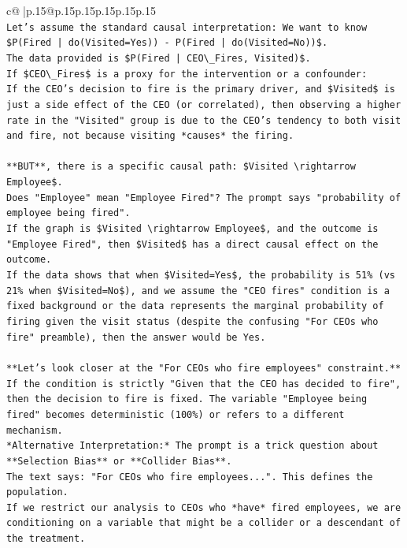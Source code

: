 \documentclass{article}
\begin{document}
{\begin{supertabular}{c@{$\;$}|p{.15\linewidth}@{}p{.15\linewidth}p{.15\linewidth}p{.15\linewidth}p{.15\linewidth}p{.15\linewidth}}
{{{\\ 
\texttt{Let's assume the standard causal interpretation: We want to know \$P(Fired | do(Visited=Yes)) {-} P(Fired | do(Visited=No))\$.} \\
\texttt{The data provided is \$P(Fired | CEO\textbackslash{}\_Fires, Visited)\$.} \\
\texttt{If \$CEO\textbackslash{}\_Fires\$ is a proxy for the intervention or a confounder:} \\
\texttt{If the CEO's decision to fire is the primary driver, and \$Visited\$ is just a side effect of the CEO (or correlated), then observing a higher rate in the "Visited" group is due to the CEO's tendency to both visit and fire, not because visiting *causes* the firing.} \\
\\ 
\texttt{**BUT**, there is a specific causal path: \$Visited \textbackslash{}rightarrow Employee\$.} \\
\texttt{Does "Employee" mean "Employee Fired"? The prompt says "probability of employee being fired".} \\
\texttt{If the graph is \$Visited \textbackslash{}rightarrow Employee\$, and the outcome is "Employee Fired", then \$Visited\$ has a direct causal effect on the outcome.} \\
\texttt{If the data shows that when \$Visited=Yes\$, the probability is 51\% (vs 21\% when \$Visited=No\$), and we assume the "CEO fires" condition is a fixed background or the data represents the marginal probability of firing given the visit status (despite the confusing "For CEOs who fire" preamble), then the answer would be Yes.} \\
\\ 
\texttt{**Let's look closer at the "For CEOs who fire employees" constraint.**} \\
\texttt{If the condition is strictly "Given that the CEO has decided to fire", then the decision to fire is fixed. The variable "Employee being fired" becomes deterministic (100\%) or refers to a different mechanism.} \\
\texttt{*Alternative Interpretation:* The prompt is a trick question about **Selection Bias** or **Collider Bias**.} \\
\texttt{The text says: "For CEOs who fire employees...". This defines the population.} \\
\texttt{If we restrict our analysis to CEOs who *have* fired employees, we are conditioning on a variable that might be a collider or a descendant of the treatment.} \\
}}}
\end{supertabular}}
\end{document}
